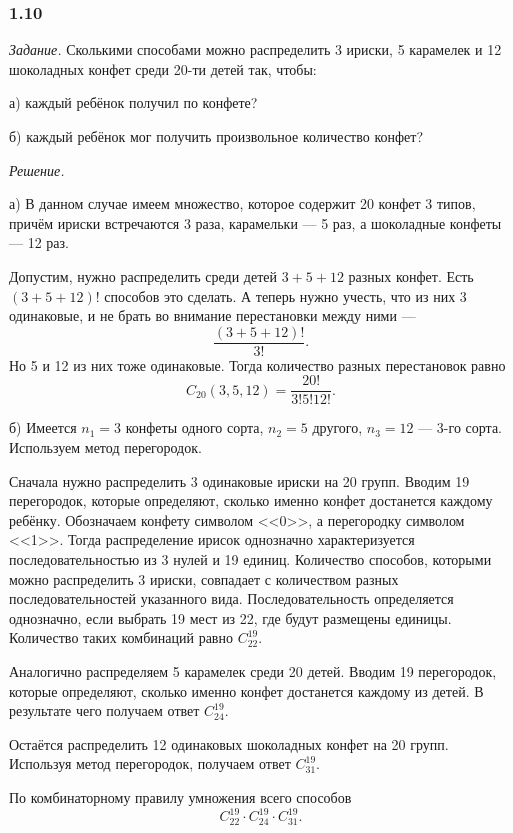 \documentclass{book}
\begin{document}
\subsubsection*{1.10}

\textit{Задание.} Сколькими способами можно распределить 3 ириски, 5 карамелек и 12 шоколадных конфет среди 20-ти детей так, чтобы:

а) каждый ребёнок получил по конфете?

б) каждый ребёнок мог получить произвольное количество конфет?

\textit{Решение.}

а) В данном случае имеем множество, которое содержит 20 конфет 3 типов, причём ириски встречаются 3 раза, карамельки --- 5 раз, а шоколадные конфеты --- 12 раз.

Допустим, нужно распределить среди детей $3+5+12$ разных конфет.
Есть $\left(3+5+12\right)!$ способов это сделать.
А теперь нужно учесть, что из них 3 одинаковые, и не брать во внимание перестановки между ними ---
$$ \frac{ \left( 3 + 5 + 12 \right)!}{3!}.$$
Но 5 и 12 из них тоже одинаковые.
Тогда количество разных перестановок равно
$$ C_{20} \left( 3, 5, 12 \right) = \frac{20!}{3!5!12!}.$$

б) Имеется $n_1=3$ конфеты одного сорта, $n_2=5$ другого, $n_3=12$ --- 3-го сорта.
Используем метод перегородок. 

Сначала нужно распределить 3 одинаковые ириски на 20 групп.
Вводим 19 перегородок, которые определяют, сколько именно конфет достанется каждому ребёнку.
Обозначаем конфету символом <<0>>, а перегородку символом <<1>>.
Тогда распределение ирисок однозначно характеризуется последовательностью из 3 нулей и 19 единиц.
Количество способов, которыми можно распределить 3 ириски, совпадает с количеством разных последовательностей указанного вида.
Последовательность определяется однозначно, если выбрать 19 мест из 22, где будут размещены единицы.
Количество таких комбинаций равно $ C_{22}^{19} $.

Аналогично распределяем 5 карамелек среди 20 детей.
Вводим 19 перегородок, которые определяют, сколько именно конфет достанется каждому из детей.
В результате чего получаем ответ $ C_{24}^{19} $.

Остаётся распределить 12 одинаковых шоколадных конфет на 20 групп.
Используя метод перегородок, получаем ответ $ C_{31}^{19} $.

По комбинаторному правилу умножения всего способов
$$ C_{22}^{19} \cdot C_{24}^{19} \cdot C_{31}^{19}.$$
\end{document}
